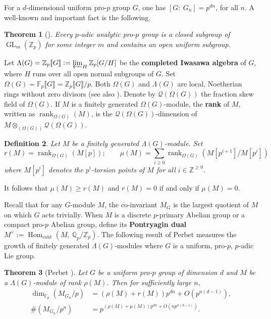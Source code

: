 \documentclass{amsart}
\DeclareMathOperator{\Hom}{Hom}
\DeclareMathOperator{\GL}{GL}
\DeclareMathOperator{\rank}{rank}
\DeclareMathOperator{\cont}{cont}
\newcommand{\QQ}{\mathbb Q}
\newcommand{\ZZ}{\mathbb Z}
\newtheorem{Th}{Theorem}[section]
\newtheorem{Defi}[Th]{Definition}
\theoremstyle{definition}
\theoremstyle{remark}
\begin{document}
For a $d$-dimensional uniform pro-$p$ group $G$,
one has $[G: \ G_n]=p^{dn}$, for all $n$.
A well-known and important fact is the following.

\begin{Th}[{\cite[Theorem II.8.32]{DdSMS03}}]
Every $p$-adic analytic pro-$p$ group is a closed subgroup of $\GL_m(\ZZ_p)$ for some integer $m$ and contains an open uniform subgroup.
\end{Th}


Let $\Lambda(G) = \ZZ_p \llbracket G \rrbracket := \varprojlim_{H} \ZZ_p[G/H]$ be the \textbf{completed Iwasawa algebra} of $G$, where $H$ runs over all open normal subgroups of $G$.
Set $\Omega(G) = \mathbb{F}_p\llbracket G \rrbracket = \ZZ_p \llbracket G \rrbracket /p$.
Both $\Omega(G)$ and $\Lambda(G)$ are local, Noetherian rings without zero divisors \cite[Chapter 7]{DdSMS03} (see also \cite{How02}).
Denote by $\mathcal{Q}\left(\Omega\left(G\right)\right)$ the fraction skew field of $\Omega(G)$.
If $M$ is a finitely generated $\Omega(G)$-module, the \textbf{rank} of $M$, written as $\rank_{\Omega(G)}(M)$, is the $\mathcal{Q}\left(\Omega\left(G\right)\right)$-dimension of $M\otimes_{\left(\Omega\left(G\right)\right)} \mathcal{Q}(\Omega(G))$.


\begin{Defi}
Let $M$ be a finitely generated $\Lambda(G)$-module.
Set
\[
r(M) = \rank_{\Omega(G)}\left(M[p]\right); \qquad \mu(M)= \sum_{i\geq 0} \rank_{\Omega(G)} \left(M[p^{i+1}]/M[p^i]\right)
\]
where $M[p^i]$ denotes the $p^i$-torsion points of $M$ for all $i\in \ZZ^{\geq 0}$.
\end{Defi} 
It follows that $\mu(M)\geq r(M)$ and $r(M)=0$ if and only if $\mu(M)=0$.

Recall that for any $G$-module $M$, the co-invariant $M_G$ is the largest quotient of $M$ on which $G$ acts trivially.
When $M$ is a discrete $p$-primary Abelian group or a compact pro-$p$ Abelian group, define its \textbf{Pontryagin dual} $M^\vee := \Hom_{\cont} (M, \ \QQ_p/\ZZ_p)$.
The following result of Perbet measures the growth of finitely generated $\Lambda(G)$-modules where $G$ is a uniform, pro-$p$, $p$-adic Lie group.

\begin{Th}[Perbet \cite{Per12}]
\label{perbet general result}
Let $G$ be a uniform pro-$p$ group of dimension $d$ and $M$ be a $\Lambda(G)$-module of rank $\rho(M)$.
Then for sufficiently large $n$,
\begin{align*}
\dim_{\mathbb{F}_p} \left(M_{G_n}/p\right) &= \left( \rho(M) + r(M)\right)p^{dn} + O\left(p^{n(d-1)}\right), \\
\# \left( M_{G_n}/p^n\right) &= p^{\left( \rho(M)+\mu(M)\right)p^{dn} + O\left(np^{n(d-1)}\right)}.
\end{align*}
\end{Th}
\end{document}
